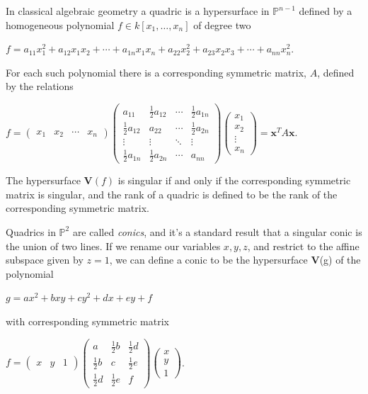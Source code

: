 \documentclass{article}
\begin{document}
In classical algebraic geometry a quadric is a hypersurface in $\mathbb{P}^{n-1}$ defined by a homogeneous polynomial $f \in k[x_{1},\ldots,x_{n}]$ of degree two
\begin{center}
  $f = a_{11}x_{1}^{2} + a_{12}x_{1}x_{2} + \cdots + a_{1n}x_{1}x_{n} + a_{22}x_{2}^{2} + a_{23}x_{2}x_{3} + \cdots + a_{nn}x_{n}^{2}$.
\end{center}
For each such polynomial there is a corresponding symmetric matrix, $A$, defined by the relations
\begin{center}
  $f = \left(\begin{array}{cccc} x_{1} & x_{2} & \cdots & x_{n}\end{array}\right)\left(\begin{array}{cccc} a_{11} & \frac{1}{2}a_{12} & \cdots & \frac{1}{2}a_{1n} \\ \frac{1}{2}a_{12} & a_{22} & \cdots & \frac{1}{2}a_{2n} \\ \vdots & \vdots & \ddots & \vdots \\ \frac{1}{2}a_{1n} & \frac{1}{2}a_{2n} & \cdots & a_{nn} \end{array}\right)\left(\begin{array}{c} x_{1} \\ x_{2} \\ \vdots \\ x_{n} \end{array}\right) = \textbf{x}^{T}A\textbf{x}$.
\end{center}
The hypersurface $\textbf{V}(f)$ is singular if and only if the corresponding symmetric matrix is singular, and the rank of a quadric is defined to be the rank of the corresponding symmetric matrix.

Quadrics in $\mathbb{P}^{2}$ are called \emph{conics}, and it's a standard result that a singular conic is the union of two lines. If we rename our variables $x,y,z$, and restrict to the affine subspace given by $z = 1$, we can define a conic to be the hypersurface \textbf{V}(g) of the polynomial
\begin{center}
  $g = ax^{2}+bxy+cy^{2}+dx+ey+f$
\end{center}
with corresponding symmetric matrix
\begin{center}
  $f = \left(\begin{array}{ccc} x & y & 1\end{array}\right)\left(\begin{array}{ccc} a & \frac{1}{2}b & \frac{1}{2}d \\ \frac{1}{2}b & c & \frac{1}{2}e \\ \frac{1}{2}d & \frac{1}{2}e & f \end{array}\right)\left(\begin{array}{c} x \\ y \\ 1 \end{array}\right)$.
\end{center}
\end{document}
